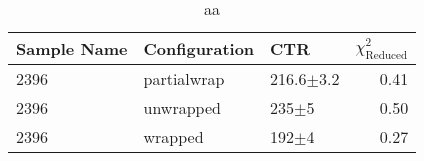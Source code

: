 \begin{table}
\caption{aa}
\begin{tabular}{lllr}
\hline
Sample Name & Configuration &            CTR &  $\chi^2_\text{Reduced}$ \\
\hline
       2396 &   partialwrap &  216.6$\pm$3.2 &                     0.41 \\
       2396 &     unwrapped &      235$\pm$5 &                     0.50 \\
       2396 &       wrapped &      192$\pm$4 &                     0.27 \\
\hline
\end{tabular}
\end{table}